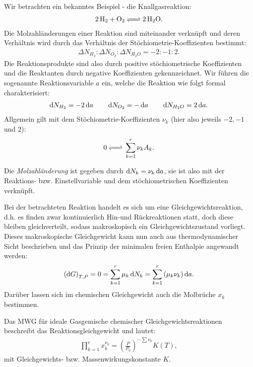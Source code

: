 Wir betrachten ein bekanntes Beispiel - die Knallgasreaktion:
\begin{align*}
    \ce{2H2 + O2 <=> 2H2O}.
\end{align*}
Die Molzahländerungen einer Reaktion sind miteinander verknüpft und deren Verhältnis wird durch das Verhältnis der Stöchiometrie-Koeffizienten bestimmt: 
\begin{align*}
    \Delta N_{H_2}:\Delta N_{O_2}:\Delta N_{H_2O}=-2:-1:2.
\end{align*}
Die Reaktionsprodukte sind also durch positive stöchiometrische Koeffizienten und die Reaktanten durch negative Koeffizienten gekennzeichnet.
Wir führen die sogenannte Reaktionsvariable $a$ ein, welche die Reaktion wie folgt formal charakterisiert:
\begin{align*}
    \mathop{}\!\mathrm{d} N_{H_2}=-2\mathop{}\!\mathrm{d} a\qquad \mathop{}\!\mathrm{d} N_{O_2}=-\mathop{}\!\mathrm{d} a \qquad \mathop{}\!\mathrm{d} N_{H_2O}=2\mathop{}\!\mathrm{d} a.
\end{align*}
Allgemein gilt mit dem Stöchiometrie-Koeffizienten $\nu_k$ (hier also jeweils $-2,-1$ und $2$):
\begin{align*}
    \ce{0 <=>} \sum_{k=1}^{r}\nu_k A_k.
\end{align*}
\begin{formal}
   Die \emph{Molzahländerung} ist gegeben durch $\mathop{}\!\mathrm{d} N_k=\nu_k \mathop{}\!\mathrm{d} a$, sie ist also mit der Reaktions- bzw. Einstellvariable und dem stöchiometrischen Koeffizienten verknüpft. 
\end{formal}

Bei der betrachteten Reaktion handelt es sich um eine Gleichgewichtsreaktion, d.h. es finden zwar kontinuierlich Hin-und Rückreaktionen statt, doch diese bleiben gleichverteilt, sodass makroskopisch ein Gleichgewichtszustand vorliegt. Dieses makroskopische Gleichgewicht kann nun auch aus thermodynamischer Sicht beschrieben und das Prinzip der minimalen freien Enthalpie angewandt werden:
\begin{align*}
    \left(\mathop{}\!\mathrm{d} G\right)_{T,P}=0=\sum_{k=1}^{r}\mu_k\mathop{}\!\mathrm{d} N_k=\sum_{k=1}^{r}\left(\mu_k\nu_k\right)\mathop{}\!\mathrm{d} a.
\end{align*}
Darüber lassen sich im chemischen Gleichgewicht auch die Molbrüche $x_k$ bestimmen.
\begin{formal}
    Das MWG für ideale Gasgemische chemischer Gleichgewichtsreaktionen beschreibt das Reaktionsgleichgewicht und lautet:
    \begin{align*}
        \prod_{k=1}^{r}x_k^{\nu_k}=\left(\frac{P}{P_0}\right)^{-\sum\nu_k}K(T),
    \end{align*}
    mit Gleichgewichts- bzw. Massenwirkungskonstante $K$. 
\end{formal}
